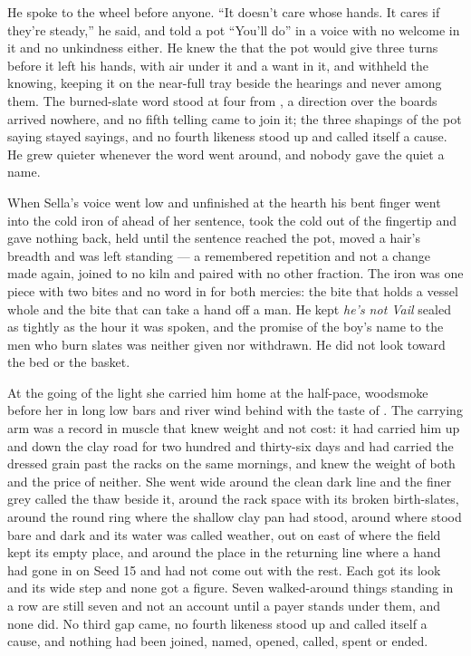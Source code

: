 He spoke to the wheel before anyone. “It doesn't care whose hands. It cares if they're steady,” he said, and told a pot “You'll do” in a voice with no welcome in it and no unkindness either. He knew the  that the pot would give three turns before it left his hands, with air under it and a want in it, and withheld the knowing, keeping it on the near-full tray beside the hearings and never among them. The burned-slate word stood at four from , a direction over the boards arrived nowhere, and no fifth telling came to join it; the three shapings of the pot saying stayed sayings, and no fourth likeness stood up and called itself a cause. He grew quieter whenever the word went around, and nobody gave the quiet a name.

When Sella's voice went low and unfinished at the hearth his bent finger went into the cold iron of  ahead of her sentence, took the cold out of the fingertip and gave nothing back, held until the sentence reached the pot, moved a hair's breadth and was left standing --- a remembered repetition and not a change made again, joined to no kiln and paired with no other fraction. The iron was one piece with two bites and no word in  for both mercies: the bite that holds a vessel whole and the bite that can take a hand off a man. He kept \emph{he's not Vail} sealed as tightly as the hour it was spoken, and the promise of the boy's name to the men who burn slates was neither given nor withdrawn. He did not look toward the bed or the basket.

\scenebreak

At the going of the light she carried him home at the half-pace, woodsmoke before her in long low bars and river wind behind with the taste of . The carrying arm was a record in muscle that knew weight and not cost: it had carried him up and down the clay road for two hundred and thirty-six days and had carried the dressed grain past the racks on the same mornings, and knew the weight of both and the price of neither. She went wide around the clean dark line and the finer grey called the thaw beside it, around the rack space with its broken birth-slates, around the round ring where the shallow clay pan had stood, around  where  stood bare and dark and its water was called weather, out on  east of  where the field kept its empty place, and around the place in the returning line where a hand had gone in on Seed 15 and had not come out with the rest. Each got its look and its wide step and none got a figure. Seven walked-around things standing in a row are still seven and not an account until a payer stands under them, and none did. No third gap came, no fourth likeness stood up and called itself a cause, and nothing had been joined, named, opened, called, spent or ended.

